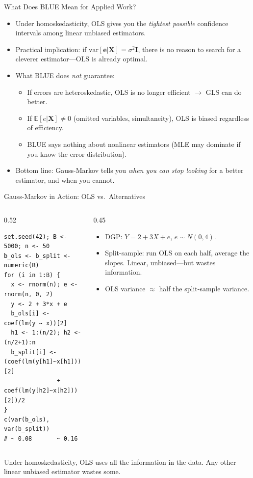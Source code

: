 \documentclass[aspectratio=169, handout]{beamer}
\numberwithin{equation}{section}
\begin{document}
\begin{frame}{What Does BLUE Mean for Applied Work?}
\begin{itemize}
\item Under homoskedasticity, OLS gives you the \emph{tightest possible} confidence intervals among linear unbiased estimators.\pause
\item Practical implication: if $\text{var}[\bm{e}|\bm{X}]=\sigma^2\bm{I}$, there is no reason to search for a cleverer estimator---OLS is already optimal.\pause
\item What BLUE does \emph{not} guarantee:
\begin{itemize}
\item If errors are heteroskedastic, OLS is no longer efficient $\to$ GLS can do better.
\item If $\mathbb{E}[e|\bm{X}]\neq 0$ (omitted variables, simultaneity), OLS is biased regardless of efficiency.
\item BLUE says nothing about nonlinear estimators (MLE may dominate if you know the error distribution).
\end{itemize}\pause
\item Bottom line: Gauss-Markov tells you \emph{when you can stop looking} for a better estimator, and when you cannot.
\end{itemize}
\end{frame}

\begin{frame}[fragile]{Gauss-Markov in Action: OLS vs.\ Alternatives}
\begin{columns}[T]
\begin{column}{0.52\textwidth}
\begin{lstlisting}[basicstyle=\ttfamily\scriptsize, numbers=none]
set.seed(42); B <- 5000; n <- 50
b_ols <- b_split <- numeric(B)
for (i in 1:B) {
  x <- rnorm(n); e <- rnorm(n, 0, 2)
  y <- 2 + 3*x + e
  b_ols[i] <- coef(lm(y ~ x))[2]
  h1 <- 1:(n/2); h2 <- (n/2+1):n
  b_split[i] <- (coef(lm(y[h1]~x[h1]))[2]
               + coef(lm(y[h2]~x[h2]))[2])/2
}
c(var(b_ols), var(b_split))
# ~ 0.08       ~ 0.16
\end{lstlisting}
\end{column}
\begin{column}{0.45\textwidth}
\begin{itemize}\setlength{\itemsep}{2pt}
\item DGP: $Y=2+3X+e$, $e\sim N(0,4)$.
\item Split-sample: run OLS on each half, average the slopes. Linear, unbiased---but wastes information.
\item OLS variance $\approx$ half the split-sample variance.
\end{itemize}
\end{column}
\end{columns}
\smallskip
\begin{tcolorbox}[colback=blue!5, colframe=blue!50, boxsep=2pt, top=2pt, bottom=2pt]
Under homoskedasticity, OLS uses all the information in the data. Any other linear unbiased estimator wastes some.
\end{tcolorbox}
\end{frame}
\end{document}
